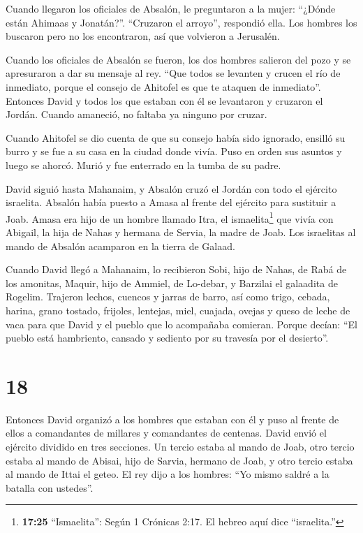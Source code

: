  Cuando llegaron los oficiales de Absalón, le preguntaron a
la mujer: ``¿Dónde están Ahimaas y Jonatán?''. ``Cruzaron el arroyo'',
respondió ella. Los hombres los buscaron pero no los encontraron, así
que volvieron a Jerusalén.

 Cuando los oficiales de Absalón se fueron, los dos hombres
salieron del pozo y se apresuraron a dar su mensaje al rey. ``Que todos
se levanten y crucen el río de inmediato, porque el consejo de Ahitofel
es que te ataquen de inmediato''.  Entonces David y todos
los que estaban con él se levantaron y cruzaron el Jordán. Cuando
amaneció, no faltaba ya ninguno por cruzar.

 Cuando Ahitofel se dio cuenta de que su consejo había sido
ignorado, ensilló su burro y se fue a su casa en la ciudad donde vivía.
Puso en orden sus asuntos y luego se ahorcó. Murió y fue enterrado en la
tumba de su padre.

 David siguió hasta Mahanaim, y Absalón cruzó el Jordán con
todo el ejército israelita.  Absalón había puesto a Amasa
al frente del ejército para sustituir a Joab. Amasa era hijo de un
hombre llamado Itra, el ismaelita\footnote{\textbf{17:25} ``Ismaelita'':
  Según 1 Crónicas 2:17. El hebreo aquí dice ``israelita.''} que vivía
con Abigail, la hija de Nahas y hermana de Servia, la madre de Joab.
 Los israelitas al mando de Absalón acamparon en la tierra
de Galaad.

 Cuando David llegó a Mahanaim, lo recibieron Sobi, hijo de
Nahas, de Rabá de los amonitas, Maquir, hijo de Ammiel, de Lo-debar, y
Barzilai el galaadita de Rogelim.  Trajeron lechos, cuencos
y jarras de barro, así como trigo, cebada, harina, grano tostado,
frijoles, lentejas,  miel, cuajada, ovejas y queso de leche
de vaca para que David y el pueblo que lo acompañaba comieran. Porque
decían: ``El pueblo está hambriento, cansado y sediento por su travesía
por el desierto''.

\hypertarget{section-17}{%
\section{18}\label{section-17}}

 Entonces David organizó a los hombres que estaban con él y
puso al frente de ellos a comandantes de millares y comandantes de
centenas.  David envió el ejército dividido en tres
secciones. Un tercio estaba al mando de Joab, otro tercio estaba al
mando de Abisai, hijo de Sarvia, hermano de Joab, y otro tercio estaba
al mando de Ittai el geteo. El rey dijo a los hombres: ``Yo mismo saldré
a la batalla con ustedes''.

